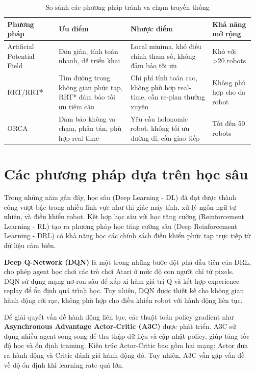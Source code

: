 \begin{table}[ht]
\centering
\caption{So sánh các phương pháp tránh va chạm truyền thống}
\label{tab:traditional_methods}
\begin{tabular}{|p{3cm}|p{3.5cm}|p{3.5cm}|p{3cm}|}
\hline
\textbf{Phương pháp} & \textbf{Ưu điểm} & \textbf{Nhược điểm} & \textbf{Khả năng mở rộng} \\
\hline
Artificial Potential Field \cite{khatib1986real} &
Đơn giản, tính toán nhanh, dễ triển khai &
Local minima, khó điều chỉnh tham số, không đảm bảo tối ưu &
Khó với >20 robots \\
\hline
RRT/RRT* \cite{lavalle1998rrt,karaman2011rrtstar} &
Tìm đường trong không gian phức tạp, RRT* đảm bảo tối ưu tiệm cận &
Chi phí tính toán cao, không phù hợp real-time, cần re-plan thường xuyên &
Không phù hợp cho đa robot \\
\hline
ORCA \cite{vandenberg2011orca} &
Đảm bảo không va chạm, phân tán, phù hợp real-time &
Yêu cầu holonomic robot, không tối ưu đường đi, cần giao tiếp &
Tốt đến 50 robots \\
\hline
\end{tabular}
\end{table}

\section{Các phương pháp dựa trên học sâu}
\label{sec:deep_learning_methods}

Trong những năm gần đây, học sâu (Deep Learning - DL) \cite{lecun2015deep} đã đạt được thành công vượt bậc trong nhiều lĩnh vực như thị giác máy tính, xử lý ngôn ngữ tự nhiên, và điều khiển robot. Kết hợp học sâu với học tăng cường (Reinforcement Learning - RL) tạo ra phương pháp học tăng cường sâu (Deep Reinforcement Learning - DRL) có khả năng học các chính sách điều khiển phức tạp trực tiếp từ dữ liệu cảm biến.

\textbf{Deep Q-Network (DQN)} \cite{mnih2015dqn} là một trong những bước đột phá đầu tiên của DRL, cho phép agent học chơi các trò chơi Atari ở mức độ con người chỉ từ pixels. DQN sử dụng mạng nơ-ron sâu để xấp xỉ hàm giá trị Q và kết hợp experience replay để ổn định quá trình học. Tuy nhiên, DQN được thiết kế cho không gian hành động rời rạc, không phù hợp cho điều khiển robot với hành động liên tục.

Để giải quyết vấn đề hành động liên tục, các thuật toán policy gradient như \textbf{Asynchronous Advantage Actor-Critic (A3C)} \cite{mnih2016asynchronous} được phát triển. A3C sử dụng nhiều agent song song để thu thập dữ liệu và cập nhật policy, giúp tăng tốc độ học và ổn định training. Kiến trúc Actor-Critic bao gồm hai mạng: Actor đưa ra hành động và Critic đánh giá hành động đó. Tuy nhiên, A3C vẫn gặp vấn đề về độ ổn định khi learning rate quá lớn.

